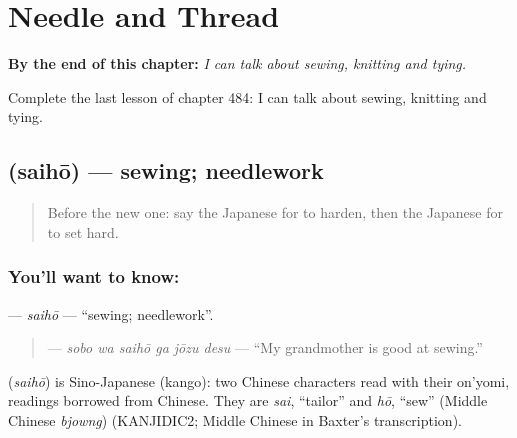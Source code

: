 
\chapter{Needle and Thread}
\label{ch:ja-needle-and-thread}

\begin{chapteropening}
\textbf{By the end of this chapter:} \emph{I can talk about sewing, knitting and tying.}

Complete the last lesson of chapter 484: I can talk about sewing, knitting and tying.
\end{chapteropening}

\section[\texorpdfstring{\ja{さいほう} (saihō)}{さいほう (saihō)}]{ (saihō) — sewing; needlework}

\label{lesson:JA-C484-saihou}



\begin{quote}
Before the new one: say the Japanese for to harden, then the Japanese for to set hard.
\end{quote}

\subsection*{You'll want to know: }
\textbf{} — \emph{saihō} — \textquotedblleft{}sewing; needlework\textquotedblright{}.

\begin{quote}
\textbf{  } — \emph{sobo wa saihō ga jōzu desu} — \textquotedblleft{}My grandmother is good at sewing.\textquotedblright{}
\end{quote}

\begin{cousinweb}
\textbf{} (\emph{saihō}) is Sino-Japanese (kango): two Chinese characters read with their on'yomi, readings borrowed from Chinese. They are \emph{sai}, \textquotedblleft{}tailor\textquotedblright{} and \emph{hō}, \textquotedblleft{}sew\textquotedblright{} (Middle Chinese \emph{bjowng}) (KANJIDIC2; Middle Chinese in Baxter's transcription).
\end{cousinweb}

